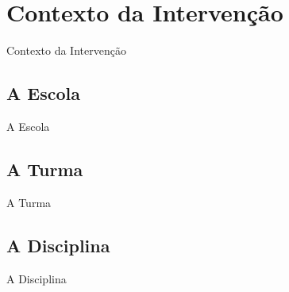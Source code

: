 \chapter{Contexto da Intervenção}

Contexto da Intervenção

\section{A Escola}
A Escola

\section{A Turma}
A Turma
\section{A Disciplina}
A Disciplina